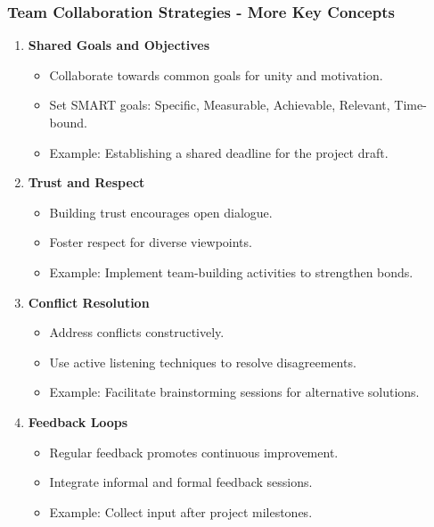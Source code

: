 \documentclass[aspectratio=169]{beamer}
\begin{document}
\begin{frame}[fragile]
    \frametitle{Team Collaboration Strategies - More Key Concepts}
    \begin{enumerate}[resume]
        \item \textbf{Shared Goals and Objectives}
            \begin{itemize}
                \item Collaborate towards common goals for unity and motivation.
                \item Set SMART goals: Specific, Measurable, Achievable, Relevant, Time-bound.
                \item Example: Establishing a shared deadline for the project draft.
            \end{itemize}
        \item \textbf{Trust and Respect}
            \begin{itemize}
                \item Building trust encourages open dialogue.
                \item Foster respect for diverse viewpoints.
                \item Example: Implement team-building activities to strengthen bonds.
            \end{itemize}
        \item \textbf{Conflict Resolution}
            \begin{itemize}
                \item Address conflicts constructively.
                \item Use active listening techniques to resolve disagreements.
                \item Example: Facilitate brainstorming sessions for alternative solutions.
            \end{itemize}
        \item \textbf{Feedback Loops}
            \begin{itemize}
                \item Regular feedback promotes continuous improvement.
                \item Integrate informal and formal feedback sessions.
                \item Example: Collect input after project milestones.
            \end{itemize}
    \end{enumerate}
\end{frame}
\end{document}
